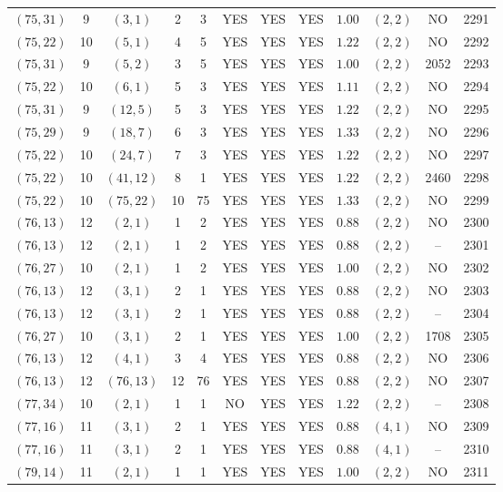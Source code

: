 \begin{longtable}{|c|c|c|c|c|c|c|c|c|c|c|c|}
$(75,31)$ & 9 & $(3,1)$ & 2 & 3 & YES & YES & YES & $1.00$ & $(2,2)$ & NO & 2291\\
$(75,22)$ & 10 & $(5,1)$ & 4 & 5 & YES & YES & YES & $1.22$ & $(2,2)$ & NO & 2292\\
$(75,31)$ & 9 & $(5,2)$ & 3 & 5 & YES & YES & YES & $1.00$ & $(2,2)$ & 2052 & 2293\\
$(75,22)$ & 10 & $(6,1)$ & 5 & 3 & YES & YES & YES & $1.11$ & $(2,2)$ & NO & 2294\\
$(75,31)$ & 9 & $(12,5)$ & 5 & 3 & YES & YES & YES & $1.22$ & $(2,2)$ & NO & 2295\\
$(75,29)$ & 9 & $(18,7)$ & 6 & 3 & YES & YES & YES & $1.33$ & $(2,2)$ & NO & 2296\\
$(75,22)$ & 10 & $(24,7)$ & 7 & 3 & YES & YES & YES & $1.22$ & $(2,2)$ & NO & 2297\\
$(75,22)$ & 10 & $(41,12)$ & 8 & 1 & YES & YES & YES & $1.22$ & $(2,2)$ & 2460 & 2298\\
$(75,22)$ & 10 & $(75,22)$ & 10 & 75 & YES & YES & YES & $1.33$ & $(2,2)$ & NO & 2299\\
$(76,13)$ & 12 & $(2,1)$ & 1 & 2 & YES & YES & YES & $0.88$ & $(2,2)$ & NO & 2300\\
$(76,13)$ & 12 & $(2,1)$ & 1 & 2 & YES & YES & YES & $0.88$ & $(2,2)$ & -- & 2301\\
$(76,27)$ & 10 & $(2,1)$ & 1 & 2 & YES & YES & YES & $1.00$ & $(2,2)$ & NO & 2302\\
$(76,13)$ & 12 & $(3,1)$ & 2 & 1 & YES & YES & YES & $0.88$ & $(2,2)$ & NO & 2303\\
$(76,13)$ & 12 & $(3,1)$ & 2 & 1 & YES & YES & YES & $0.88$ & $(2,2)$ & -- & 2304\\
$(76,27)$ & 10 & $(3,1)$ & 2 & 1 & YES & YES & YES & $1.00$ & $(2,2)$ & 1708 & 2305\\
$(76,13)$ & 12 & $(4,1)$ & 3 & 4 & YES & YES & YES & $0.88$ & $(2,2)$ & NO & 2306\\
$(76,13)$ & 12 & $(76,13)$ & 12 & 76 & YES & YES & YES & $0.88$ & $(2,2)$ & NO & 2307\\
$(77,34)$ & 10 & $(2,1)$ & 1 & 1 & NO & YES & YES & $1.22$ & $(2,2)$ & -- & 2308\\
$(77,16)$ & 11 & $(3,1)$ & 2 & 1 & YES & YES & YES & $0.88$ & $(4,1)$ & NO & 2309\\
$(77,16)$ & 11 & $(3,1)$ & 2 & 1 & YES & YES & YES & $0.88$ & $(4,1)$ & -- & 2310\\
$(79,14)$ & 11 & $(2,1)$ & 1 & 1 & YES & YES & YES & $1.00$ & $(2,2)$ & NO & 2311\\

\end{longtable}
